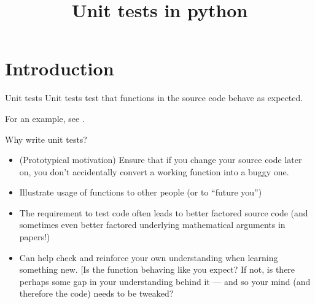 \documentclass[10pt]{beamer}
\title{Unit tests in python}
\begin{document}
\maketitle

\section{Introduction}

\begin{frame}{Unit tests}
\alert{Unit tests} test that functions in the source code behave as expected. 

 For an example, see \href{https://github.com/mikewojnowicz/acc/blob/master/tests/unit/test_arithmetic.py}{}.
\end{frame}

\begin{frame}{Why write unit tests?}
\begin{itemize}
\item (Prototypical motivation) Ensure that if you change your source code later on, you don’t accidentally convert a working function into a buggy one.  %
\item Illustrate usage of functions to other people (or to “future you”)
\item The requirement to test code often leads to better factored source code {\tiny (and sometimes even better factored underlying mathematical arguments in papers!)}  %
\item Can help check and reinforce your own understanding when learning something new. {\tiny [Is the function behaving like you expect?  If not, is there perhaps some gap in your understanding behind it — and so your mind (and therefore the code) needs to be tweaked?}    %
\end{itemize}
	
\end{frame}
\end{document}
